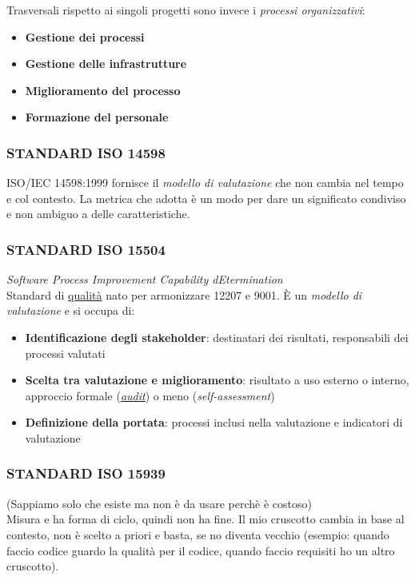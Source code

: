 			Trasversali rispetto ai singoli progetti sono invece i \textit{processi organizzativi}:
				\begin{itemize}
					\item \textbf{Gestione dei processi}
					\item \textbf{Gestione delle infrastrutture}
					\item \textbf{Miglioramento del processo}
					\item \textbf{Formazione del personale}
				\end{itemize}



			\subsubsection{STANDARD ISO 14598}		\label{14596}
			ISO/IEC 14598:1999 fornisce il \textit{modello di valutazione} che non cambia nel tempo e col contesto. La metrica che adotta è un modo
			per dare un significato condiviso e non ambiguo a delle caratteristiche.


			\subsubsection{STANDARD ISO 15504}		\label{15504}
			\textit{Software Process Improvement Capability dEtermination} \\
			Standard di \underline{\hyperref[qualita]{qualità}} nato per armonizzare 12207 e 9001. È un \textit{modello di valutazione} e si occupa di:
			\begin{itemize}
				\item \textbf{Identificazione degli stakeholder}: destinatari dei risultati, responsabili dei processi valutati
				\item \textbf{Scelta tra valutazione e miglioramento}: risultato a uso esterno o interno, approccio formale (\underline{\hyperref[audit]{\textit{audit}}}) o meno (\textit{self-assessment})
				\item \textbf{Definizione della portata}: processi inclusi nella valutazione e indicatori di valutazione
			\end{itemize}


			\subsubsection{STANDARD ISO 15939}		%
			(Sappiamo solo che esiste ma non è da usare perchè è costoso) \\
			Misura e ha forma di ciclo, quindi non ha fine.
			Il mio cruscotto cambia in base al contesto, non è scelto a priori e basta, se no diventa vecchio (esempio: quando faccio codice guardo la qualità per il codice, quando faccio requisiti ho un altro cruscotto).


